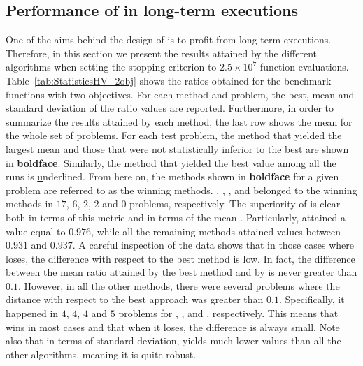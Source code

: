 \subsection{Performance of \MOEAS{} in long-term executions}

One of the aims behind the design of \AVSDMOEAD{} is to profit from long-term executions.
%
Therefore, in this section we present the results attained by the different algorithms when setting 
the stopping criterion to $2.5 \times 10^7$ function evaluations.
%
Table~\ref{tab:StatisticsHV_2obj} shows the \HV{} ratios obtained for the benchmark functions with two objectives.
%
For each method and problem, the best, mean and standard deviation of the \HV{} ratio values are reported.
%
Furthermore, in order to summarize the results attained by each method, the last row shows the mean for the whole set 
of problems.
%
For each test problem, the method that yielded the largest mean and those that were not statistically inferior to the 
best are shown in \textbf{boldface}.
%
Similarly, the method that yielded the best \HV{} value among all the runs is {\ul underlined}.
%
From here on, the methods shown in {\bf boldface} for a given problem are referred to as the winning methods.
%
\AVSDMOEAD{}, \RMOEA{}, \MOEADDE{}, \NSGAIII{} and \NSGAII{} belonged to the winning methods in 
$17$, $6$, $2$, $2$ and $0$ problems, respectively.
%
The superiority of \AVSDMOEAD{} is clear both in terms of this metric and in terms of the mean \HV{}.
%
Particularly, \AVSDMOEAD{} attained a value equal to $0.976$, while all the remaining methods attained values between
$0.931$ and $0.937$.
%
A careful inspection of the data shows that in those cases where \AVSDMOEAD{} loses, the difference with respect to the best 
method is low.
%
In fact, the difference between the mean \HV{} ratio attained by the best method and by \AVSDMOEAD{} is never greater than $0.1$.
%
However, in all the other methods, there were several problems where the distance with respect to the best approach
was greater than $0.1$.
%
Specifically, it happened in $4$, $4$, $4$ and $5$ problems for \RMOEA{}, \MOEADDE{}, \NSGAII{} and \NSGAIII{}, respectively.
%
This means that \AVSDMOEAD{} wins in most cases and that when it loses, the difference is always small.
%
Note also that in terms of standard deviation, \AVSDMOEAD{} yields much lower values than all the other algorithms, meaning
it is quite robust.


